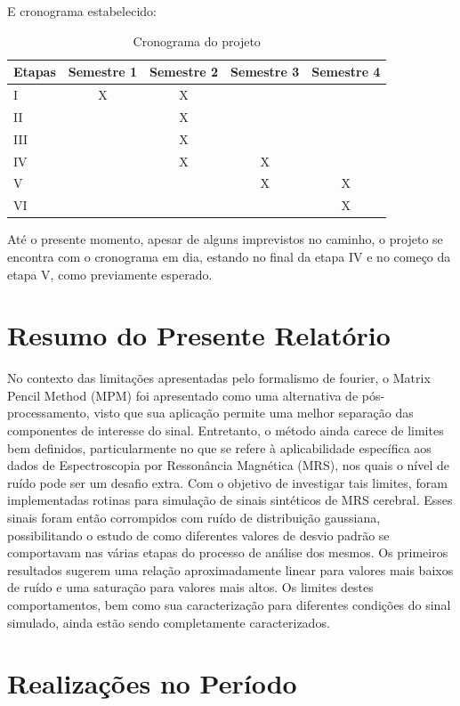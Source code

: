 \documentclass{article}
\begin{document}
E cronograma estabelecido:

\begin{table}[H] 
    \centering
    \begin{tabular}{|l|c|c|c|c|}
    \hline
    Etapas & Semestre 1 & Semestre 2 & Semestre 3 & Semestre 4 \\
    \hline
    I & X & X & & \\
    \hline
    II &  & X & & \\
    \hline
    III & & X & & \\
    \hline
    IV & & X & X &\\
    \hline
    V & & & X & X\\
    \hline
    VI & & & & X \\
    \hline
    \end{tabular}
    \caption{Cronograma do projeto}
    \label{table:2}
\end{table}

Até o presente momento, apesar de alguns imprevistos no caminho, o projeto se encontra com o cronograma em dia, estando no final da etapa IV e no começo da etapa V, 
como previamente esperado.

\section{Resumo do Presente Relatório}
No contexto das limitações apresentadas pelo formalismo de fourier, o Matrix Pencil Method (MPM) foi apresentado como uma 
alternativa de pós-processamento, visto que sua aplicação permite uma melhor separação das componentes 
de interesse do sinal.  Entretanto, o método ainda carece de limites bem definidos, particularmente no 
que se refere à aplicabilidade específica aos dados de Espectroscopia por Ressonância Magnética (MRS), 
nos quais o nível de ruído pode ser um desafio extra. Com o objetivo de investigar tais limites, foram 
implementadas rotinas para simulação de sinais sintéticos de MRS cerebral. Esses sinais foram então 
corrompidos com ruído de distribuição gaussiana, possibilitando o estudo de como diferentes valores de 
desvio padrão se comportavam nas várias etapas do processo de análise dos mesmos. Os primeiros resultados 
sugerem uma relação aproximadamente linear para valores mais baixos de ruído e uma saturação para valores 
mais altos. Os limites destes comportamentos, bem como sua caracterização para diferentes condições do sinal 
simulado, ainda estão sendo completamente caracterizados.


\section{Realizações no Período}
\end{document}
